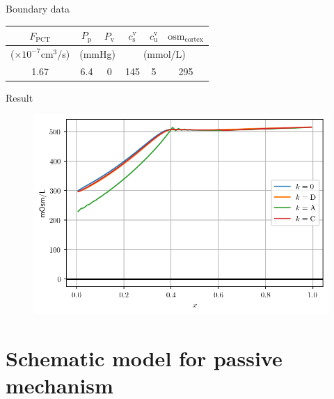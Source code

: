 \documentclass{beamer}
\begin{document}
\begin{frame}{Boundary data}
    \begin{tabular}{||c|c c|c c c||} 
        \hline
        $F_\mathrm{PCT}$ & $P_\mathrm{p}$ & $P_\mathrm{v}$ & $c_\mathrm{s}^\mathrm{v}$ & $c_\mathrm{u}^{\mathrm{v}} $ & $\mathrm{osm}_\mathrm{cortex}$ \\
        \hline
        {\tiny ($\times 10^{-7}\text{cm}^{3}$/s)} & \multicolumn{2}{|c|}{{\tiny (mmHg)}} & \multicolumn{3}{|c||}{{\tiny (mmol/L)}}\\
        \hline\hline
        1.67 & 6.4 & 0 & 145 & 5 & 295 \\ %
        \hline
       \end{tabular}       
\end{frame}
    
\begin{frame}{Result}
    
    \begin{figure}
        \centering
        \includegraphics[width=\textwidth]{../results/6-6-2023/osm.png}
    \end{figure}
\end{frame}

\section{Schematic model for passive mechanism}
\end{document}
